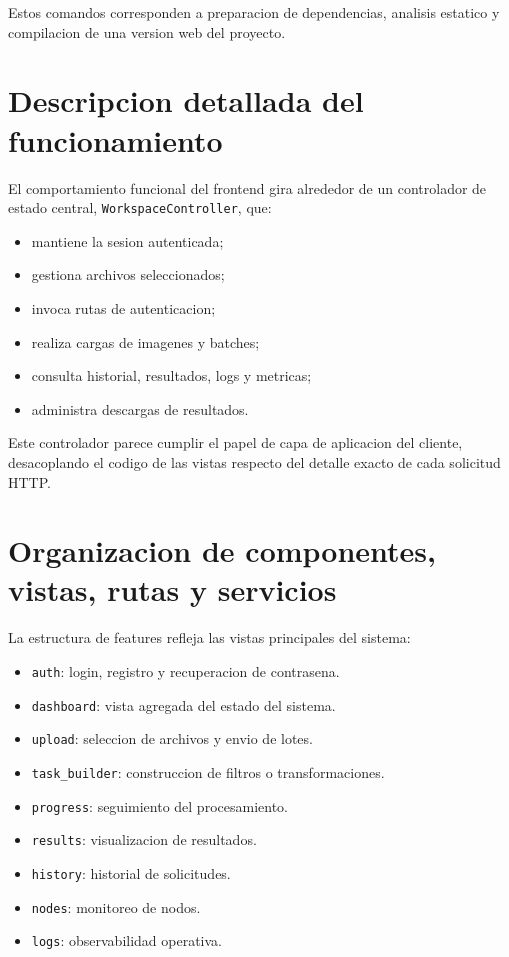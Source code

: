 \documentclass[conference]{IEEEtran}
\begin{document}
Estos comandos corresponden a preparacion de dependencias, analisis estatico y compilacion de una version web del proyecto.

\section{Descripcion detallada del funcionamiento}
El comportamiento funcional del frontend gira alrededor de un controlador de estado central, \texttt{WorkspaceController}, que:

\begin{itemize}[leftmargin=*]
\item mantiene la sesion autenticada;
\item gestiona archivos seleccionados;
\item invoca rutas de autenticacion;
\item realiza cargas de imagenes y batches;
\item consulta historial, resultados, logs y metricas;
\item administra descargas de resultados.
\end{itemize}

Este controlador parece cumplir el papel de capa de aplicacion del cliente, desacoplando el codigo de las vistas respecto del detalle exacto de cada solicitud HTTP.

\section{Organizacion de componentes, vistas, rutas y servicios}
La estructura de features refleja las vistas principales del sistema:

\begin{itemize}[leftmargin=*]
\item \texttt{auth}: login, registro y recuperacion de contrasena.
\item \texttt{dashboard}: vista agregada del estado del sistema.
\item \texttt{upload}: seleccion de archivos y envio de lotes.
\item \texttt{task\_builder}: construccion de filtros o transformaciones.
\item \texttt{progress}: seguimiento del procesamiento.
\item \texttt{results}: visualizacion de resultados.
\item \texttt{history}: historial de solicitudes.
\item \texttt{nodes}: monitoreo de nodos.
\item \texttt{logs}: observabilidad operativa.
\end{itemize}
\end{document}
